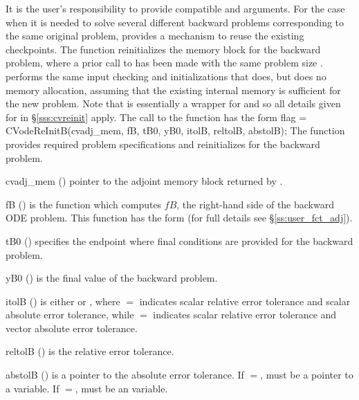 {
  {\warn} It is the user's responsibility to provide compatible  and
   arguments.
}
For the case when it is needed to solve several different backward problems 
corresponding to the same original problem, {\cvodes} provides a mechanism 
to reuse the existing checkpoints. The function  reinitializes
the {\cvodes} memory block for the backward problem, where a prior call to
 has been made with the same problem size .
 performs the same input checking and initializations that 
 does, but does no memory allocation, 
assuming that the existing internal memory is sufficient for the new problem. 
Note that  is essentially a wrapper for 
and so all details given for  in \S\ref{sss:cvreinit}
apply.
The call to the  function has the form
{
  flag = CVodeReInitB(cvadj\_mem, fB, tB0, yB0, itolB, reltolB, abstolB);
}
{
  The function  provides required problem specifications 
  and reinitializes {\cvodes} for the backward problem.
}
{
  \begin{args}
  \item[cvadj\_mem] ()
    pointer to the adjoint memory block returned by .
  \item[fB] ()
    is the {\C} function which computes $fB$, the right-hand side of the 
    backward ODE problem. This function has the form 
     (for full details see \S\ref{ss:user_fct_adj}).
  \item[tB0] ()
    specifies the endpoint where final conditions are provided for the 
    backward problem.
  \item[yB0] ()
    is the final value of the backward problem. 
  \item[itolB] () 
    is either  or , where $=$ indicates scalar relative error 
    tolerance and scalar absolute error tolerance, while $=$ indicates scalar
    relative error tolerance and vector absolute error tolerance. 
  \item[reltolB] ()
    is the relative error tolerance.
  \item[abstolB] ()
    is a pointer to the absolute error tolerance. If $=$, 
    must be a pointer to a  variable. If $=$, 
    must be an  variable.
  \end{args}
}
